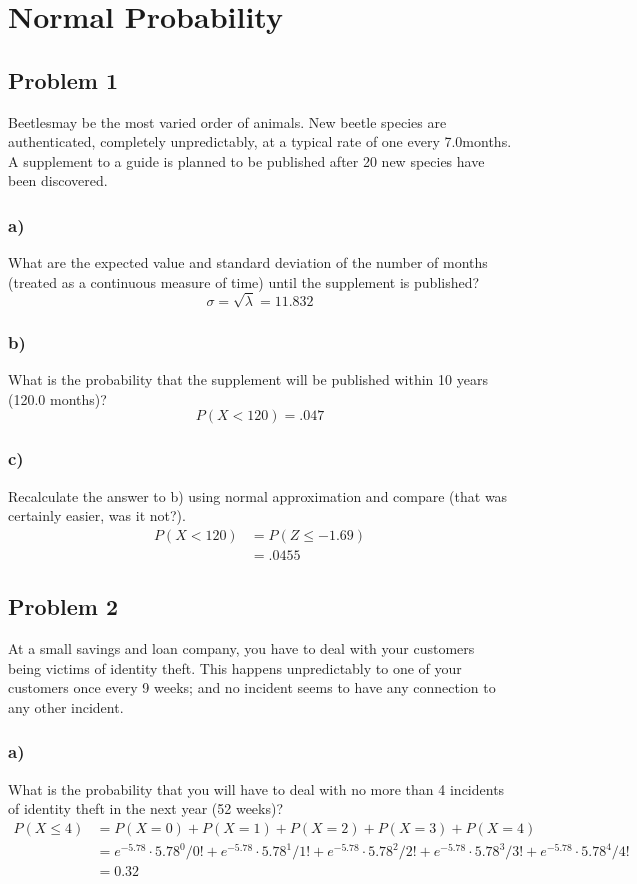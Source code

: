 \documentclass{article}
\begin{document}
\section*{Normal Probability}
\subsection*{Problem 1}
Beetlesmay be the most varied order of animals. New beetle species are authenticated, completely unpredictably, at a typical rate of one every 7.0months. A supplement to a guide is planned to be published after 20 new species have been discovered.
\subsubsection*{a)}
What are the expected value and standard deviation of the number of months (treated as a continuous measure of time) until the supplement is published?
\begin{equation}
    \sigma = \sqrt{\lambda} = \boxed{11.832}
\end{equation}
\subsubsection*{b)}
What is the probability that the supplement will be published within 10 years (120.0 months)?
\begin{equation}
    P(X < 120) = \boxed{.047}
\end{equation}
\subsubsection*{c)}
Recalculate the answer to b) using normal approximation and compare (that was certainly easier, was it not?).
\begin{align}
    P(X < 120) &= P(Z \leq -1.69)\\
    &= \boxed{.0455}
\end{align}
\subsection*{Problem 2}
At a small savings and loan company, you have to deal with your customers being victims of identity theft. This happens unpredictably to one of your customers once every 9 weeks; and no incident seems to have any connection to any other incident.
\subsubsection*{a)}
What is the probability that you will have to deal with no more than 4 incidents of identity theft in the next year (52 weeks)?
\begin{align}
P(X \leq 4) &= P(X = 0) + P(X = 1) + P(X = 2) + P(X = 3) + P(X = 4)\\
&= e^{-5.78} \cdot 5.78^0 /0! + e^{-5.78} \cdot 5.78^1 /1! + e^{-5.78} \cdot 5.78^2/2! + e^{-5.78} \cdot 5.78^3/3! + e^{-5.78} \cdot 5.78^4/4!\\
&= \boxed{0.32}    
\end{align}
\end{document}
